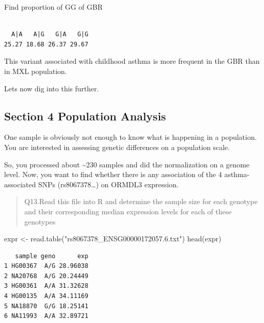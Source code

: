 \documentclass[
  letterpaper,
  DIV=11,
  numbers=noendperiod]{scrartcl}
\newenvironment{Shaded}{\begin{snugshade}}{\end{snugshade}}
\newcommand{\DecValTok}[1]{\textcolor[rgb]{0.68,0.00,0.00}{#1}}
\newcommand{\FunctionTok}[1]{\textcolor[rgb]{0.28,0.35,0.67}{#1}}
\newcommand{\NormalTok}[1]{\textcolor[rgb]{0.00,0.23,0.31}{#1}}
\newcommand{\OtherTok}[1]{\textcolor[rgb]{0.00,0.23,0.31}{#1}}
\newcommand{\SpecialCharTok}[1]{\textcolor[rgb]{0.37,0.37,0.37}{#1}}
\newcommand{\StringTok}[1]{\textcolor[rgb]{0.13,0.47,0.30}{#1}}
\begin{document}
Find proportion of G\textbar G of GBR

\begin{Shaded}
\end{Shaded}

\begin{verbatim}

  A|A   A|G   G|A   G|G 
25.27 18.68 26.37 29.67 
\end{verbatim}

This variant associated with childhood asthma is more frequent in the
GBR than in MXL population.

Lets now dig into this further.

\subsection{Section 4 Population
Analysis}\label{section-4-population-analysis}

One sample is obviously not enough to know what is happening in a
population. You are interested in assessing genetic differences on a
population scale.

So, you processed about \textasciitilde230 samples and did the
normalization on a genome level. Now, you want to find whether there is
any association of the 4 asthma-associated SNPs (rs8067378\ldots) on
ORMDL3 expression.

\begin{quote}
Q13.Read this file into R and determine the sample size for each
genotype and their corresponding median expression levels for each of
these genotypes
\end{quote}

\begin{Shaded}
\begin{Highlighting}[]
\NormalTok{expr }\OtherTok{\textless{}{-}} \FunctionTok{read.table}\NormalTok{(}\StringTok{"rs8067378\_ENSG00000172057.6.txt"}\NormalTok{)}
\FunctionTok{head}\NormalTok{(expr)}
\end{Highlighting}
\end{Shaded}

\begin{verbatim}
   sample geno      exp
1 HG00367  A/G 28.96038
2 NA20768  A/G 20.24449
3 HG00361  A/A 31.32628
4 HG00135  A/A 34.11169
5 NA18870  G/G 18.25141
6 NA11993  A/A 32.89721
\end{verbatim}
\end{document}
